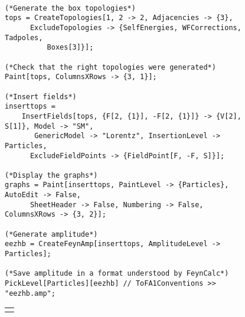 \begin{figure}[H]
\begin{footnotesize}
\begin{verbatim}

(*Generate the box topologies*)
tops = CreateTopologies[1, 2 -> 2, Adjacencies -> {3}, 
      ExcludeTopologies -> {SelfEnergies, WFCorrections, Tadpoles, 
          Boxes[3]}];

(*Check that the right topologies were generated*)
Paint[tops, ColumnsXRows -> {3, 1}];

(*Insert fields*)
inserttops = 
    InsertFields[tops, {F[2, {1}], -F[2, {1}]} -> {V[2], S[1]}, Model -> "SM",
       GenericModel -> "Lorentz", InsertionLevel -> Particles, 
      ExcludeFieldPoints -> {FieldPoint[F, -F, S]}];

(*Display the graphs*)
graphs = Paint[inserttops, PaintLevel -> {Particles}, AutoEdit -> False, 
      SheetHeader -> False, Numbering -> False, ColumnsXRows -> {3, 2}];

(*Generate amplitude*)
eezhb = CreateFeynAmp[inserttops, AmplitudeLevel -> Particles];

(*Save amplitude in a format understood by FeynCalc*)
PickLevel[Particles][eezhb] // ToFA1Conventions >> "eezhb.amp";

\end{verbatim}
\end{footnotesize}
\begin{tabular*}{0.8\textwidth}{c}\hhline\end{tabular*}
\end{figure}

